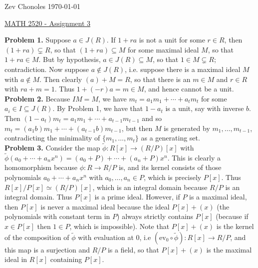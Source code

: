 \documentclass[11pt]{article}
\newcommand{\num}[1]{\noindent \textbf{#1}}
\theoremstyle{definition}
\begin{document}
\noindent Zev Chonoles \hfill \today\\[-0.4in]
\begin{center}
\noindent \underline{MATH 2520 - Assignment 3}
\end{center}

\num{Problem 1.} Suppose $a\in J(R)$. If $1+ra$ is not a unit for some $r\in R$, then $(1+ra)\subsetneq R$, so that $(1+ra)\subseteq M$ for some maximal ideal $M$, so that $1+ra\in M$. But by hypothesis, $a\in J(R)\subseteq M$, so that $1\in M\subsetneq R$; contradiction. Now suppose $a\notin J(R)$, i.e. suppose there is a maximal ideal $M$ with $a\notin M$. Then clearly $(a)+M=R$, so that there is an $m\in M$ and $r\in R$ with $ra+m=1$. Thus $1+(-r)a=m\in M$, and hence cannot be a unit.       \\

\num{Problem 2.} Because $IM=M$, we have $m_t=a_1m_1+\cdots+a_tm_t$ for some $a_i\in I\subseteq J(R)$. By Problem 1, we have that $1-a_t$ is a unit, say with inverse $b$. Then $(1-a_t)m_t=a_1m_1+\cdots+a_{t-1}m_{t-1}$ and so $m_t=(a_1b)m_1+\cdots+(a_{t-1}b)m_{t-1}$, but then $M$ is generated by $m_1,\ldots,m_{t-1}$, contradicting the minimality of $\{m_1,\ldots,m_t\}$ as a generating set.       \\

\num{Problem 3.} Consider the map $\tilde{\phi}:R[x]\rightarrow(R/P)[x]$ with $\tilde{\phi}(a_0+\cdots+a_nx^n)=(a_0+P)+\cdots+(a_n+P)x^n$. This is clearly a homomorphism because $\phi:R\rightarrow R/P$ is, and its kernel consists of those polynomials $a_0+\cdots+a_nx^n$ with $a_0,\ldots,a_n\in P$, which is precisely $P[x]$. Thus $R[x]/P[x]\simeq (R/P)[x]$, which is an integral domain because $R/P$ is an integral domain. Thus $P[x]$ is a prime ideal. However, if $P$ is a maximal ideal, then $P[x]$ is never a maximal ideal because the ideal $P[x]+(x)$ (the polynomials with constant term in $P$) always strictly contains $P[x]$ (because if $x\in P[x]$ then $1\in P$, which is impossible). Note that $P[x]+(x)$ is the kernel of the composition of $\tilde{\phi}$ with evaluation at 0, i.e $(\text{ev}_0\circ\tilde{\phi}):R[x]\rightarrow R/P$, and this map is a surjection and $R/P$ is a field, so that $P[x]+(x)$ is the maximal ideal in $R[x]$ containing $P[x]$.       \\
\end{document}

